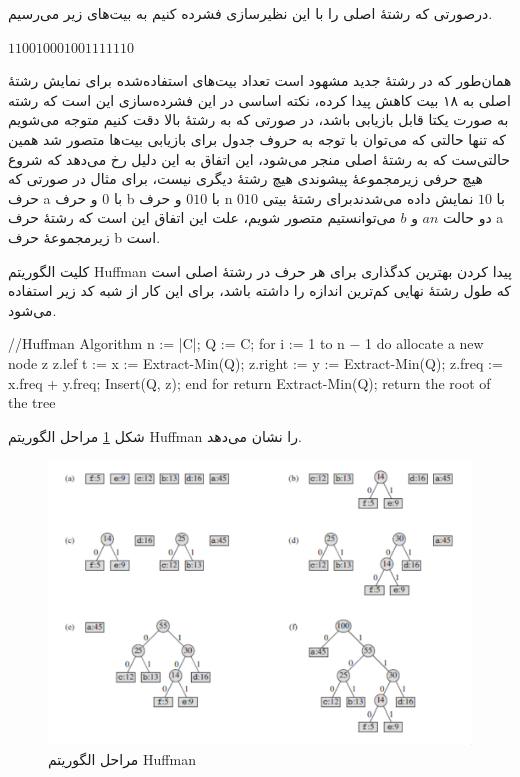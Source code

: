 درصورتی که رشتهٔ اصلی را با این نظیرسازی فشرده کنیم به بیت‌های زیر می‌رسیم.

\begin{center}
        $110010001001111110$
\end{center}

همان‌طور که در رشتهٔ جدید مشهود است تعداد بیت‌های استفاده‌شده برای نمایش
رشتهٔ اصلی به ۱۸ بیت کاهش پیدا کرده، نکته اساسی در این فشرده‌سازی 
این است که رشته به صورت یکتا قابل بازیابی باشد، در صورتی که به رشتهٔ بالا
دقت کنیم متوجه می‌شویم که تنها حالتی که می‌توان با توجه به حروف جدول برای
بازیابی بیت‌ها متصور شد همین حالتی‌ست که به رشتهٔ اصلی منجر می‌شود، این اتفاق به این دلیل
رخ می‌دهد که شروع هیچ حرفی زیرمجموعهٔ پیشوندی هیچ رشتهٔ دیگری نیست، 
برای مثال در صورتی که حرف a با 
$0$ 
و حرف b
با 
$010$ 
و حرف 
n 
با 
$10$ 
نمایش داده می‌شدندبرای رشتهٔ بیتی 
$010$
دو حالت
$an$
و 
$b$
می‌توانستیم متصور شویم، علت این اتفاق این است که رشتهٔ حرف 
a 
زیرمجموعهٔ حرف 
b
است. 

کلیت الگوریتم Huffman پیدا کردن بهترین کدگذاری برای هر حرف در رشتهٔ اصلی 
است که طول رشتهٔ نهایی کم‌ترین اندازه را داشته باشد، برای این کار از شبه کد زیر استفاده می‌شود.
\cite{huffman}
\vspace{5mm}

\begin{code}
//Huffman Algorithm
n := |C|;
Q := C;
for i := 1 to n − 1 do
        allocate a new node z
        z.lef t := x := Extract-Min(Q);
        z.right := y := Extract-Min(Q);
        z.freq := x.freq + y.freq;
        Insert(Q, z);
end for
return Extract-Min(Q); {return the root of the tree}
\end{code}
\vspace{5mm}
شکل 
\ref{huffman_tree}
مراحل الگوریتم Huffman را نشان می‌دهد.

\begin{figure}[]
        \centering
        \includegraphics[width=\textwidth]{figs/huffamn_tree.png}
        \caption{مراحل الگوریتم Huffman \cite{huffman_tree}}
        \label{huffman_tree}
\end{figure}

